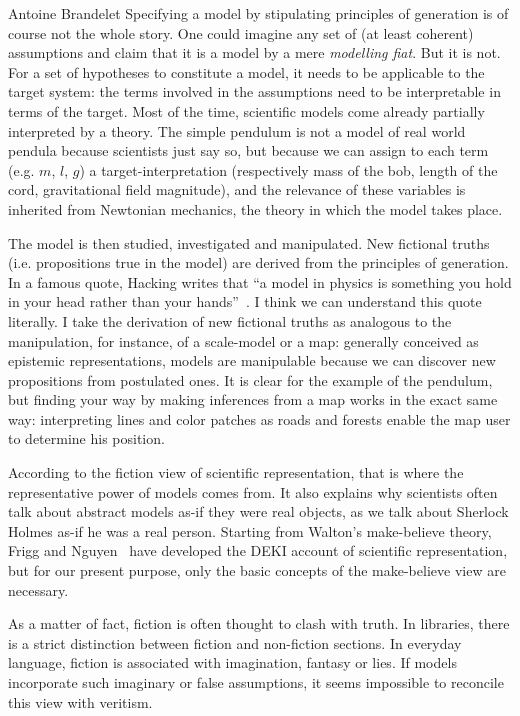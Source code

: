 \begin{artengenv}{Antoine Brandelet}
Specifying a model by stipulating principles of generation is of course not the whole story. One could imagine any set of (at least coherent) assumptions and claim that it is a model by a mere \textit{modelling fiat}. But it is not. For a set of hypotheses to constitute a model, it needs to be applicable to the target system: the terms involved in the assumptions need to be interpretable in terms of the target. Most of the time, scientific models come already partially interpreted by a theory. The simple pendulum is not a model of real world pendula because scientists just say so, but because we can assign to each term (e.g. $m$, $l$, $g$) a target-interpretation (respectively mass of the bob, length of the cord, gravitational field magnitude), and the relevance of these variables is inherited from Newtonian mechanics, the theory in which the model takes place.

The model is then studied, investigated and manipulated. New fictional truths (i.e. propositions true in the model) are derived from the principles of generation. In a famous quote, Hacking writes that ``a model in physics is something you hold in your head rather than your hands''~\parencite{Hacking1983}. I think we can understand this quote literally. I take the derivation of new fictional truths as analogous to the manipulation, for instance, of a scale-model or a map: generally conceived as epistemic representations, models are manipulable because we can discover new propositions from postulated ones. It is clear for the example of the pendulum, but finding your way by making inferences from a map works in the exact same way: interpreting lines and color patches as roads and forests enable the map user to determine his position.

According to the fiction view of scientific representation, that is where the representative power of models comes from. It also explains why scientists often talk about abstract models as-if they were real objects, as we talk about Sherlock Holmes as-if he was a real person. Starting from Walton's make-believe theory, Frigg and Nguyen~\parencite*{Frigg2020} have developed the DEKI account of scientific representation, but for our present purpose, only the basic concepts of the make-believe view are necessary.

As a matter of fact, fiction is often thought to clash with truth. In libraries, there is a strict distinction between fiction and non-fiction sections. In everyday language, fiction is associated with imagination, fantasy or lies. If models incorporate such imaginary or false assumptions, it seems impossible to reconcile this view with veritism.


\end{artengenv}
